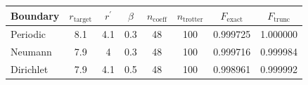 \begin{tabular}{lccccccc}
\toprule
Boundary & $r_{\mathrm{target}}$ & $r^\prime$ & $\beta$ & $n_{\mathrm{coeff}}$ & $n_{\mathrm{trotter}}$ & $F_{\mathrm{exact}}$ & $F_{\mathrm{trunc}}$ \\
\midrule
Periodic & 8.1 & 4.1 & 0.3 & 48 & 100 & 0.999725 & 1.000000 \\
Neumann & 7.9 & 4 & 0.3 & 48 & 100 & 0.999716 & 0.999984 \\
Dirichlet & 7.9 & 4.1 & 0.5 & 48 & 100 & 0.998961 & 0.999992 \\
\bottomrule
\end{tabular}
